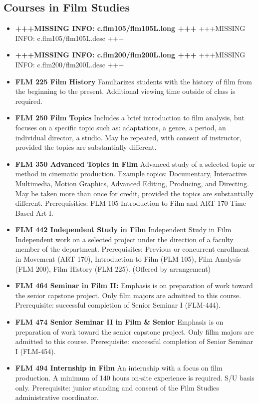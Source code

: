 \documentclass[
  letterpaper,
]{scrbook}
\providecommand{\tightlist}{%
  \setlength{\itemsep}{0pt}\setlength{\parskip}{0pt}}
\begin{document}
\subsection{Courses in Film Studies}\label{courses-in-film-studies}

\begin{itemize}
\tightlist
\item
  \textbf{+++MISSING INFO: c.flm105/flm105L.long +++} +++MISSING INFO:
  c.flm105/flm105L.desc +++
\item
  \textbf{+++MISSING INFO: c.flm200/flm200L.long +++} +++MISSING INFO:
  c.flm200/flm200L.desc +++
\item
  \textbf{FLM 225 Film History} Familiarizes students with the history
  of film from the beginning to the present. Additional viewing time
  outside of class is required.
\item
  \textbf{FLM 250 Film Topics} Includes a brief introduction to film
  analysis, but focuses on a specific topic such as: adaptations, a
  genre, a period, an individual director, a studio. May be repeated,
  with consent of instructor, provided the topics are substantially
  different.
\item
  \textbf{FLM 350 Advanced Topics in Film} Advanced study of a selected
  topic or method in cinematic production. Example topics: Documentary,
  Interactive Multimedia, Motion Graphics, Advanced Editing, Producing,
  and Directing. May be taken more than once for credit, provided the
  topics are substantially different. Prerequisities: FLM-105
  Introduction to Film and ART-170 Time-Based Art I.
\item
  \textbf{FLM 442 Independent Study in Film} Independent Study in Film
  Independent work on a selected project under the direction of a
  faculty member of the department. Prerequisites: Previous or
  concurrent enrollment in Movement (ART 170), Introduction to Film (FLM
  105), Film Analysis (FLM 200), Film History (FLM 225). (Offered by
  arrangement)
\item
  \textbf{FLM 464 Seminar in Film II:} Emphasis is on preparation of
  work toward the senior capstone project. Only film majors are admitted
  to this course. Prerequisite: successful completion of Senior Seminar
  I (FLM-444).
\item
  \textbf{FLM 474 Senior Seminar II in Film \& Senior} Emphasis is on
  preparation of work toward the senior capstone project. Only fillm
  majors are admitted to this course. Prerequisite: successful
  completion of Senior Seminar I (FLM-454).
\item
  \textbf{FLM 494 Internship in Film} An internship with a focus on film
  production. A minimum of 140 hours on-site experience is required. S/U
  basis only. Prerequisite: junior standing and consent of the Film
  Studies administrative coordinator.
\end{itemize}
\end{document}

